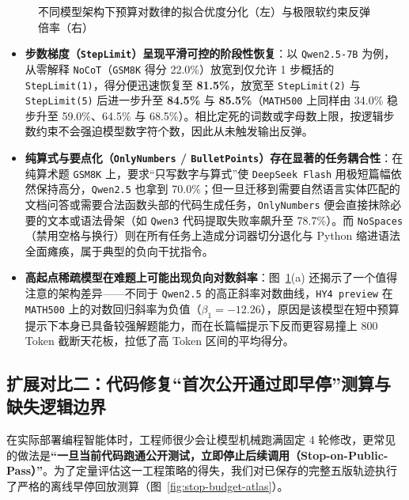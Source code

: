 \begin{figure}[!htbp]
\centering
{}\hfill
{}
\caption{不同模型架构下预算对数律的拟合优度分化（左）与极限软约束反弹倍率（右）}
\label{fig:step-format-atlas}
\end{figure}

\begin{itemize}
  \item \textbf{步数梯度（\texttt{StepLimit}）呈现平滑可控的阶段性恢复}：以 \texttt{Qwen2.5-7B} 为例，从零解释 \texttt{NoCoT}（\texttt{GSM8K} 得分 22.0\%）放宽到仅允许 1 步概括的 \texttt{StepLimit(1)}，得分便迅速恢复至 \textbf{81.5\%}，放宽至 \texttt{StepLimit(2)} 与 \texttt{StepLimit(5)} 后进一步升至 \textbf{84.5\%} 与 \textbf{85.5\%}（\texttt{MATH500} 上同样由 34.0\% 稳步升至 59.0\%、64.5\% 与 68.5\%）。相比定死的词数或字母数上限，按逻辑步数约束不会强迫模型数字符个数，因此从未触发输出反弹。
  \item \textbf{纯算式与要点化（\texttt{OnlyNumbers} / \texttt{BulletPoints}）存在显著的任务耦合性}：在纯算术题 \texttt{GSM8K} 上，要求“只写数字与算式”使 \texttt{DeepSeek Flash} 用极短篇幅依然保持高分，\texttt{Qwen2.5} 也拿到 70.0\%；但一旦迁移到需要自然语言实体匹配的文档问答或需要合法函数头部的代码生成任务，\texttt{OnlyNumbers} 便会直接抹除必要的文本或语法骨架（如 \texttt{Qwen3} 代码提取失败率飙升至 78.7\%）。而 \texttt{NoSpaces}（禁用空格与换行）则在所有任务上造成分词器切分退化与 Python 缩进语法全面瘫痪，属于典型的负向干扰指令。
  \item \textbf{高起点稀疏模型在难题上可能出现负向对数斜率}：图~\ref{fig:step-format-atlas}(a) 还揭示了一个值得注意的架构差异——不同于 \texttt{Qwen2.5} 的高正斜率对数曲线，\texttt{HY4 preview} 在 \texttt{MATH500} 上的对数回归斜率为负值（$\beta_1 = -12.26$），原因是该模型在短中预算提示下本身已具备较强解题能力，而在长篇幅提示下反而更容易撞上 800 Token 截断天花板，拉低了高 Token 区间的平均得分。
\end{itemize}

\subsection{扩展对比二：代码修复“首次公开通过即早停”测算与缺失逻辑边界}

在实际部署编程智能体时，工程师很少会让模型机械跑满固定 4 轮修改，更常见的做法是\textbf{“一旦当前代码跑通公开测试，立即停止后续调用（Stop-on-Public-Pass）”}。为了定量评估这一工程策略的得失，我们对已保存的完整五版轨迹执行了严格的离线早停回放测算（图~\ref{fig:stop-budget-atlas}）。

